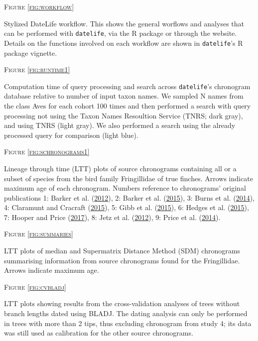 \documentclass[]{article}
\begin{document}
\newpage

\begin{center}
\textsc{Figure \ref{fig:workflow}}
\end{center}
Stylized DateLife workflow. This shows the general worflows and analyses that can be performed with \texttt{datelife}, via the R package or through the website. Details on the functions involved on each workflow are shown in \texttt{datelife}'s R package vignette.

\begin{center}
\textsc{Figure \ref{fig:runtime1}}
\end{center}
Computation time of query processing and search across \texttt{datelife}'s chronogram database relative to number of input taxon names. We sampled N names from the class Aves for each cohort 100 times and then performed a search with query processing not using the Taxon Names Resoultion Service (TNRS; dark gray), and using TNRS (light gray). We also performed a search using the already processed query for comparison (light blue). 

\begin{center}
\textsc{Figure \ref{fig:schronograms1}}
\end{center}
Lineage through time (LTT) plots of source chronograms containing all or a subset of species from the bird family Fringillidae of true finches. Arrows indicate maximum age of each chronogram. Numbers reference to chronograms' original publications 1: Barker et al. (\protect\hyperlink{ref-barker2012going}{2012}), 2: Barker et al. (\protect\hyperlink{ref-barker2015new}{2015}), 3: Burns et al. (\protect\hyperlink{ref-burns2014phylogenetics}{2014}), 4: Claramunt and Cracraft (\protect\hyperlink{ref-claramunt2015new}{2015}), 5: Gibb et al. (\protect\hyperlink{ref-gibb2015new}{2015}), 6: Hedges et al. (\protect\hyperlink{ref-Hedges2015}{2015}), 7: Hooper and Price (\protect\hyperlink{ref-hooper2017chromosomal}{2017}), 8: Jetz et al. (\protect\hyperlink{ref-Jetz2012}{2012}), 9: Price et al. (\protect\hyperlink{ref-price2014niche}{2014}).

\begin{center}
\textsc{Figure \ref{fig:summaries}}
\end{center}
LTT plots of median and Supermatrix Distance Method (SDM) chronograms summarising information from source chronograms found for the Fringillidae. Arrows indicate maximum age.

\begin{center}
\textsc{Figure \ref{fig:cvbladj}}
\end{center}
LTT plots showing results from the cross-validation analyses of trees without branch lengths dated using BLADJ. The dating analysis can only be performed in trees with more than 2 tips, thus excluding chronogram from study 4; its data was still used as calibration for the other source chronograms.
\end{document}

